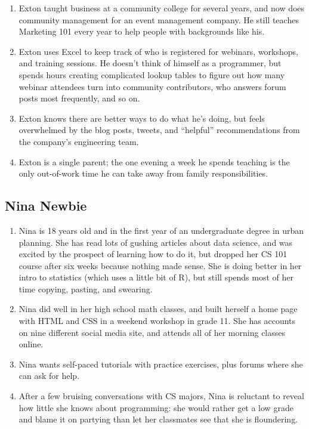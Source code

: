 \documentclass[]{Nemilov}
\providecommand{\tightlist}{%
  \setlength{\itemsep}{0pt}\setlength{\parskip}{0pt}}
\begin{document}
\begin{enumerate}
\def\labelenumi{\arabic{enumi}.}
\tightlist
\item
  Exton taught business at a community college for several years,
  and now does community management for an event management company.
  He still teaches Marketing 101 every year to help people with backgrounds like his.
\item
  Exton uses Excel to keep track of who is registered for webinars, workshops, and training sessions.
  He doesn't think of himself as a programmer,
  but spends hours creating complicated lookup tables to figure out
  how many webinar attendees turn into community contributors,
  who answers forum posts most frequently,
  and so on.
\item
  Exton knows there are better ways to do what he's doing,
  but feels overwhelmed by the blog posts, tweets, and ``helpful'' recommendations
  from the company's engineering team.
\item
  Exton is a single parent;
  the one evening a week he spends teaching is the only out-of-work time
  he can take away from family responsibilities.
\end{enumerate}

\hypertarget{nina-newbie}{%
\subsection{Nina Newbie}\label{nina-newbie}}

\begin{enumerate}
\def\labelenumi{\arabic{enumi}.}
\tightlist
\item
  Nina is 18 years old and in the first year of an undergraduate degree in urban planning.
  She has read lots of gushing articles about data science,
  and was excited by the prospect of learning how to do it,
  but dropped her CS 101 course after six weeks because nothing made sense.
  She is doing better in her intro to statistics (which uses a little bit of R),
  but still spends most of her time copying, pasting, and swearing.
\item
  Nina did well in her high school math classes,
  and built herself a home page with HTML and CSS in a weekend workshop in grade 11.
  She has accounts on nine different social media site,
  and attends all of her morning classes online.
\item
  Nina wants self-paced tutorials with practice exercises,
  plus forums where she can ask for help.
\item
  After a few bruising conversations with CS majors,
  Nina is reluctant to reveal how little she knows about programming:
  she would rather get a low grade and blame it on partying
  than let her classmates see that she is floundering.
\end{enumerate}
\end{document}
